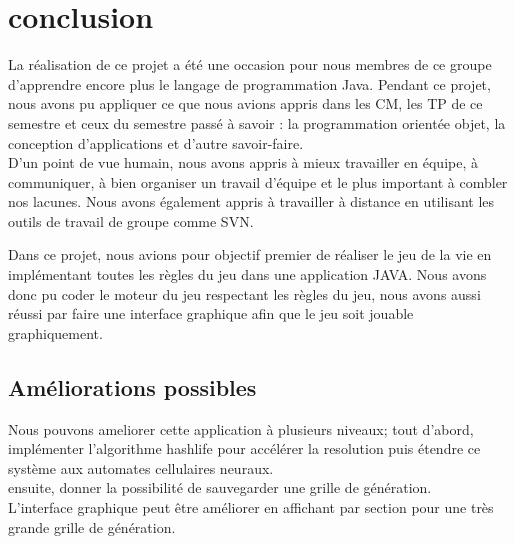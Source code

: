 \documentclass[a4paper,12pt]{article} %
\begin{document}
\section{conclusion} 

		La réalisation de ce projet a été une occasion pour nous membres de ce groupe d’apprendre encore plus le langage de programmation Java.
		Pendant ce projet, nous avons pu appliquer ce que nous avions appris dans les CM, les TP de ce semestre et ceux du semestre passé à savoir : la programmation orientée objet, la conception d'applications et d'autre savoir-faire. \\
D'un point de vue humain, nous avons appris à mieux travailler en équipe, à communiquer, à bien organiser un travail d'équipe et le plus important à combler nos lacunes.  
		Nous avons également appris à travailler à distance en utilisant les outils de travail de groupe comme SVN.
		
			Dans ce projet, nous avions pour objectif premier de réaliser le jeu de la vie  en implémentant toutes les règles du jeu dans une application JAVA. Nous avons donc pu coder le moteur du jeu respectant les règles du jeu, nous avons aussi réussi par faire une interface graphique afin que le jeu soit jouable graphiquement. 
			
			\subsection{Améliorations possibles   }
			
			Nous pouvons ameliorer cette application à plusieurs niveaux; tout d'abord, implémenter l'algorithme hashlife pour accélérer la resolution puis étendre ce système aux automates cellulaires neuraux.
			\\ ensuite, donner la possibilité de sauvegarder une grille de génération.
			\\L’interface graphique peut être améliorer en affichant par section pour une très grande grille de génération.
			
\end{document}
